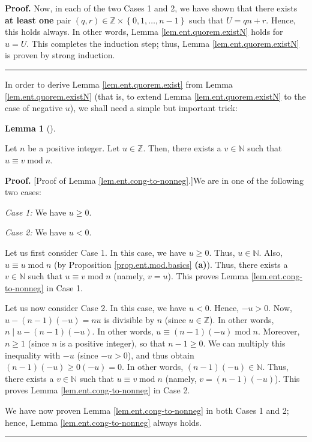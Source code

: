 \documentclass[numbers=enddot,12pt,final,onecolumn,notitlepage]{scrartcl}%
\numberwithin{exer}{subsection}
\theoremstyle{definition}
\newtheorem{lem}[theo]{Lemma}
\newenvironment{lemma}[1][]
{\begin{lem}[#1]\begin{leftbar}}
{\end{leftbar}\end{lem}}
\newenvironment{proof}[1][Proof]{\noindent\textbf{#1.} }{\ \rule{0.5em}{0.5em}}
\begin{document}
\begin{proof}
Now, in each of the two Cases 1 and 2, we have shown that there exists
\textbf{at least one} pair $\left(  q,r\right)  \in\mathbb{Z}\times\left\{
0,1,\ldots,n-1\right\}  $ such that $U=qn+r$. Hence, this holds always. In
other words, Lemma \ref{lem.ent.quorem.existN} holds for $u=U$. This completes
the induction step; thus, Lemma \ref{lem.ent.quorem.existN} is proven by
strong induction.
\end{proof}

In order to derive Lemma \ref{lem.ent.quorem.exist} from Lemma
\ref{lem.ent.quorem.existN} (that is, to extend Lemma
\ref{lem.ent.quorem.existN} to the case of negative $u$), we shall need a
simple but important trick:

\begin{lemma}
\label{lem.ent.cong-to-nonneg}Let $n$ be a positive integer. Let
$u\in\mathbb{Z}$. Then, there exists a $v\in\mathbb{N}$ such that $u\equiv
v\operatorname{mod}n$.
\end{lemma}

\begin{proof}
[Proof of Lemma \ref{lem.ent.cong-to-nonneg}.]We are in one of the following
two cases:

\textit{Case 1:} We have $u\geq0$.

\textit{Case 2:} We have $u<0$.

Let us first consider Case 1. In this case, we have $u\geq0$. Thus,
$u\in\mathbb{N}$. Also, $u\equiv u\operatorname{mod}n$ (by Proposition
\ref{prop.ent.mod.basics} \textbf{(a)}). Thus, there exists a $v\in\mathbb{N}$
such that $u\equiv v\operatorname{mod}n$ (namely, $v=u$). This proves Lemma
\ref{lem.ent.cong-to-nonneg} in Case 1.

Let us now consider Case 2. In this case, we have $u<0$. Hence, $-u>0$. Now,
$u-\left(  n-1\right)  \left(  -u\right)  =nu$ is divisible by $n$ (since
$u\in\mathbb{Z}$). In other words, $n\mid u-\left(  n-1\right)  \left(
-u\right)  $. In other words, $u\equiv\left(  n-1\right)  \left(  -u\right)
\operatorname{mod}n$. Moreover, $n\geq1$ (since $n$ is a positive integer), so
that $n-1\geq0$. We can multiply this inequality with $-u$ (since $-u>0$), and
thus obtain $\left(  n-1\right)  \left(  -u\right)  \geq0\left(  -u\right)
=0$. In other words, $\left(  n-1\right)  \left(  -u\right)  \in\mathbb{N}$.
Thus, there exists a $v\in\mathbb{N}$ such that $u\equiv v\operatorname{mod}n$
(namely, $v=\left(  n-1\right)  \left(  -u\right)  $). This proves Lemma
\ref{lem.ent.cong-to-nonneg} in Case 2.

We have now proven Lemma \ref{lem.ent.cong-to-nonneg} in both Cases 1 and 2;
hence, Lemma \ref{lem.ent.cong-to-nonneg} always holds.
\end{proof}
\end{document}
